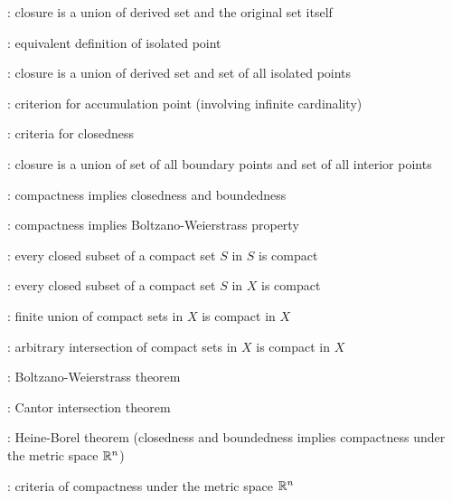 \item {}: closure is a union of derived set and the original set itself
\item {}: equivalent definition of isolated point
\item {}: closure is a union of derived set and set of all isolated points
\item {}: criterion for accumulation point (involving infinite cardinality)
\item {}: criteria for closedness
\item {}: closure is a union of set of all boundary points and set of all interior points
\item {}: compactness implies closedness and boundedness
\item {}: compactness implies Boltzano-Weierstrass property
\item {}: every closed subset of a compact set \(S\) in \(S\) is compact
\item {}: every closed subset of a compact set \(S\) in \(X\) is compact
\item {}: finite union of compact sets in \(X\) is compact in \(X\)
\item {}: arbitrary intersection of compact sets in \(X\) is compact in \(X\)
\item {}: Boltzano-Weierstrass theorem
\item {}: Cantor intersection theorem
\item {}: Heine-Borel theorem (closedness and boundedness
implies compactness under the metric space \(\mathbb{R}^n\))
\item {}: criteria of compactness
under the metric space \(\mathbb{R}^n\)
